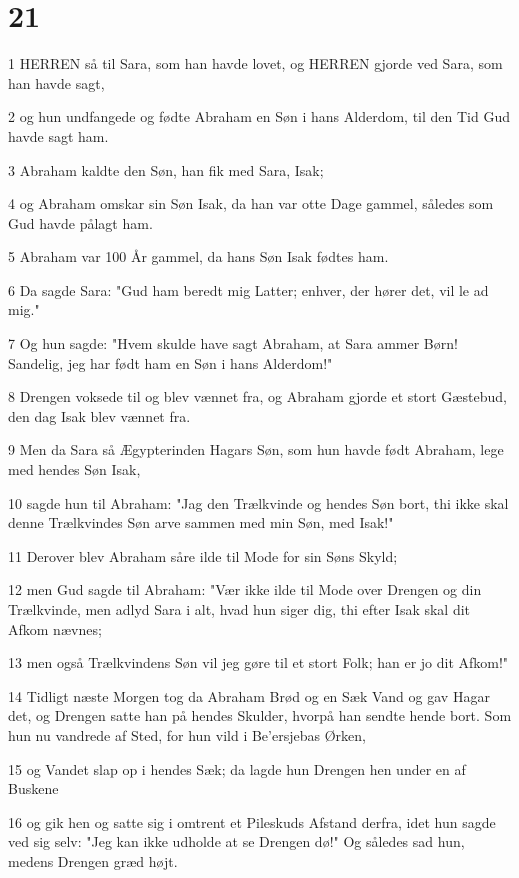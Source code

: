 \chapter{21}

\par 1 HERREN så til Sara, som han havde lovet, og HERREN gjorde ved Sara, som han havde sagt,
\par 2 og hun undfangede og fødte Abraham en Søn i hans Alderdom, til den Tid Gud havde sagt ham.
\par 3 Abraham kaldte den Søn, han fik med Sara, Isak;
\par 4 og Abraham omskar sin Søn Isak, da han var otte Dage gammel, således som Gud havde pålagt ham.
\par 5 Abraham var 100 År gammel, da hans Søn Isak fødtes ham.
\par 6 Da sagde Sara: "Gud ham beredt mig Latter; enhver, der hører det, vil le ad mig."
\par 7 Og hun sagde: "Hvem skulde have sagt Abraham, at Sara ammer Børn! Sandelig, jeg har født ham en Søn i hans Alderdom!"
\par 8 Drengen voksede til og blev vænnet fra, og Abraham gjorde et stort Gæstebud, den dag Isak blev vænnet fra.
\par 9 Men da Sara så Ægypterinden Hagars Søn, som hun havde født Abraham, lege med hendes Søn Isak,
\par 10 sagde hun til Abraham: "Jag den Trælkvinde og hendes Søn bort, thi ikke skal denne Trælkvindes Søn arve sammen med min Søn, med Isak!"
\par 11 Derover blev Abraham såre ilde til Mode for sin Søns Skyld;
\par 12 men Gud sagde til Abraham: "Vær ikke ilde til Mode over Drengen og din Trælkvinde, men adlyd Sara i alt, hvad hun siger dig, thi efter Isak skal dit Afkom nævnes;
\par 13 men også Trælkvindens Søn vil jeg gøre til et stort Folk; han er jo dit Afkom!"
\par 14 Tidligt næste Morgen tog da Abraham Brød og en Sæk Vand og gav Hagar det, og Drengen satte han på hendes Skulder, hvorpå han sendte hende bort. Som hun nu vandrede af Sted, for hun vild i Be'ersjebas Ørken,
\par 15 og Vandet slap op i hendes Sæk; da lagde hun Drengen hen under en af Buskene
\par 16 og gik hen og satte sig i omtrent et Pileskuds Afstand derfra, idet hun sagde ved sig selv: "Jeg kan ikke udholde at se Drengen dø!" Og således sad hun, medens Drengen græd højt.
